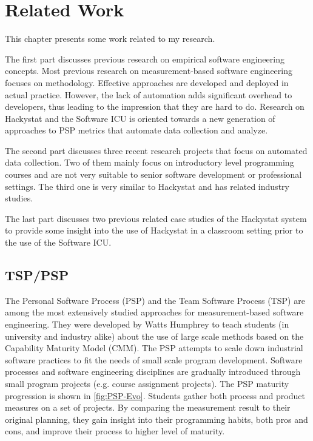 \chapter{Related Work}
This chapter presents some work related to my research.

The first part discusses previous research on empirical software engineering concepts. Most previous research on measurement-based software engineering focuses on methodology. Effective approaches are developed and deployed in actual practice. However, the lack of automation adds significant overhead to developers, thus leading to the impression that they are hard to do. Research on Hackystat and the Software ICU is oriented towards a new generation of approaches to PSP metrics that automate data collection and analyze\cite{csdl2-02-07}.

The second part discusses three recent research projects that focus on automated data collection. Two of them mainly focus on introductory level programming courses and are not very suitable to senior software development or professional settings. The third one is very similar to Hackystat and has related industry studies.


The last part discusses two previous related case studies of the Hackystat system to provide some insight into the use of Hackystat in a classroom setting prior to the use of the Software ICU.

\section {TSP/PSP}
The Personal Software Process (PSP)\cite{book:psp} and the Team Software Process (TSP)\cite{book:tsp} are among the most extensively studied approaches for measurement-based software engineering. They were developed by Watts Humphrey to teach students (in university and industry alike) about the use of large scale methods based on the Capability Maturity Model (CMM)\cite{cmm}. The PSP attempts to scale down industrial software practices to fit the needs of small scale program development. Software processes and software engineering disciplines are gradually introduced through small program projects (e.g. course assignment projects). The PSP maturity progression is shown in \autoref{fig:PSP-Evo}. Students gather both process and product measures on a set of projects. By comparing the measurement result to their original planning, they gain insight into their programming habits, both pros and cons, and improve their process to higher level of maturity.

